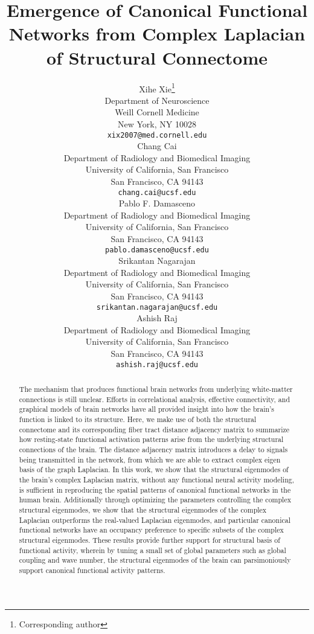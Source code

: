 \documentclass{article}
\title{Emergence of Canonical Functional Networks from Complex Laplacian of Structural Connectome}
\author{
  Xihe Xie\thanks{Corresponding author} \\
  Department of Neuroscience\\
  Weill Cornell Medicine\\
  New York, NY 10028 \\
  \texttt{xix2007@med.cornell.edu} \\
   \And
  Chang Cai \\
  Department of Radiology and Biomedical Imaging\\
  University of California, San Francisco\\
  San Francisco, CA 94143\\
  \texttt{chang.cai@ucsf.edu} \\
   \And
  Pablo F. Damasceno \\
  Department of Radiology and Biomedical Imaging\\
  University of California, San Francisco\\
  San Francisco, CA 94143\\
  \texttt{pablo.damasceno@ucsf.edu}\\
  \And
  Srikantan Nagarajan \\
  Department of Radiology and Biomedical Imaging\\
  University of California, San Francisco\\
  San Francisco, CA 94143\\
  \texttt{srikantan.nagarajan@ucsf.edu} \\
  \And
  Ashish Raj \\
  Department of Radiology and Biomedical Imaging\\
  University of California, San Francisco\\
  San Francisco, CA 94143\\
  \texttt{ashish.raj@ucsf.edu} \\
}
\begin{document}
\maketitle

\begin{abstract}
The mechanism that produces functional brain networks from underlying white-matter connections is still unclear. Efforts in correlational analysis, effective connectivity, and graphical models of brain networks have all provided insight into how the brain's function is linked to its structure. Here, we make use of both the structural connectome and its corresponding fiber tract distance adjacency matrix to summarize how resting-state functional activation patterns arise from the underlying structural connections of the brain. The distance adjacency matrix introduces a delay to signals being transmitted in the network, from which we are able to extract complex eigen basis of the graph Laplacian. In this work, we show that the structural eigenmodes of the brain's complex Laplacian matrix, without any functional neural activity modeling, is sufficient in reproducing the spatial patterns of canonical functional networks in the human brain. Additionally through optimizing the parameters controlling the complex structural eigenmodes, we show that the structural eigenmodes of the complex Laplacian outperforms the real-valued Laplacian eigenmodes, and particular canonical functional networks have an occupancy preference to specific subsets of the complex structural eigenmodes. These results provide further support for structural basis of functional activity, wherein by tuning a small set of global parameters such as global coupling and wave number, the structural eigenmodes of the brain can parsimoniously support canonical functional activity patterns.
\end{abstract}

\end{document}
